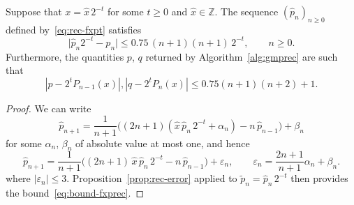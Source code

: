 \documentclass{siamart0216}
\newcommand{\abs}[1]{\mathopen| #1 \mathclose|}
\begin{document}
\begin{corollary}
Suppose that $x = \hat x \, 2^{-t}$ for some $t \geq 0$ and
$\hat x \in \mathbb Z$.
The sequence $(\hat p_n)_{n \geq 0}$ defined by \eqref{eq:rec-fxpt}
satisfies
\begin{equation} \label{eq:bound-fxprec}
  \abs{ \hat p_n 2^{-t} - p_n }
  \leq 0.75 \, (n+1) (n+1) \, 2^{-t},
  \qquad
  n \geq 0.
\end{equation}
Furthermore, the quantities $p$, $q$ returned by Algorithm~\ref{alg:gmprec}
are such that
\begin{equation} \label{eq:bound-gmprec}
  |p - 2^t P_{n-1}(x)|, |q - 2^t P_{n}(x)|
  \le 0.75 (n+1)(n+2) + 1.
\end{equation}
\end{corollary}

\begin{proof}
We can write
\[
  \hat{p}_{n + 1} = \frac{1}{n + 1}  \bigl((2 n + 1)  (\hat{x} \,
        \hat{p}_n \, 2^{- t} + \alpha_n) - n \, \hat{p}_{n - 1}\bigr)
        + \beta_n
\]
for some $\alpha_n$, $\beta_n$ of absolute value at most one, and
hence
\[
  \hat{p}_{n + 1} = \frac{1}{n + 1}  \bigl((2 n + 1) \, \hat{x} \,
  \hat{p}_n \, 2^{- t} - n \, \hat{p}_{n - 1}\bigr) + \varepsilon_n,
  \qquad
  \varepsilon_n = \frac{2 n + 1}{n + 1} \alpha_n + \beta_n.
\]
where $\abs{\varepsilon_n} \leq 3$.
Proposition \ref{prop:rec-error} applied to
$\tilde p_n = \hat p_n \, 2^{-t}$
then provides the bound~\eqref{eq:bound-fxprec}.

\newcommand{\vp}{\mathtt p}
\newcommand{\vq}{\mathtt q}
\newcommand{\vd}{\mathtt d}


\end{proof}
\end{document}
